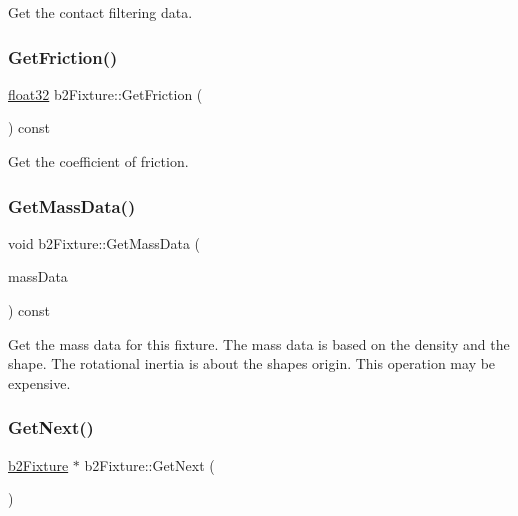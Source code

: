 Get the contact filtering data. 

\mbox{\label{classb2_fixture_a2853d799f299cb1ce76e48261d42a5ad}} 
\subsubsection{\texorpdfstring{GetFriction()}{GetFriction()}}
{\footnotesize\ttfamily \mbox{\hyperlink{b2_settings_8h_aacdc525d6f7bddb3ae95d5c311bd06a1}{float32}} b2\+Fixture\+::\+Get\+Friction (\begin{DoxyParamCaption}{ }\end{DoxyParamCaption}) const\hspace{0.3cm}{\ttfamily [inline]}}



Get the coefficient of friction. 

\mbox{\label{classb2_fixture_a4532a12e848c5ceb5a3b94cf45b7cbad}} 
\subsubsection{\texorpdfstring{GetMassData()}{GetMassData()}}
{\footnotesize\ttfamily void b2\+Fixture\+::\+Get\+Mass\+Data (\begin{DoxyParamCaption}\item[{\mbox{\hyperlink{structb2_mass_data}{b2\+Mass\+Data}} $\ast$}]{mass\+Data }\end{DoxyParamCaption}) const\hspace{0.3cm}{\ttfamily [inline]}}

Get the mass data for this fixture. The mass data is based on the density and the shape. The rotational inertia is about the shape\textquotesingle{}s origin. This operation may be expensive. \mbox{\label{classb2_fixture_a0241952461f6f1a04a3c850306390fd2}} 
\subsubsection{\texorpdfstring{GetNext()}{GetNext()}\hspace{0.1cm}{\footnotesize\ttfamily [1/2]}}
{\footnotesize\ttfamily \mbox{\hyperlink{classb2_fixture}{b2\+Fixture}} $\ast$ b2\+Fixture\+::\+Get\+Next (\begin{DoxyParamCaption}{ }\end{DoxyParamCaption})\hspace{0.3cm}{\ttfamily [inline]}}

